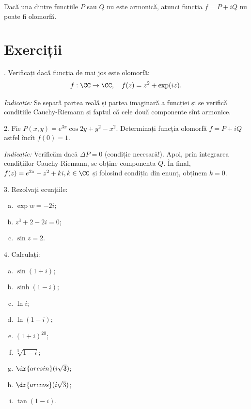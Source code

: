 \begin{corollary}\label{cor:not-olo}
  Dacă una dintre funcțiile $ P $ sau $ Q $ nu este armonică, atunci funcția
  $ f = P + iQ $ nu poate fi olomorfă.
\end{corollary}


\section{Exerciții}

\indent{}. Verificați dacă funcția de mai jos este olomorfă:
\[
  f : \CC \to \CC, \quad f(z) = z^2 + \exp(iz).
\]

\emph{Indicație:} Se separă partea reală și partea imaginară a funcției
și se verifică condițiile Cauchy-Riemann și faptul că cele două componente
sînt armonice.

\vspace{0.3cm}

2. Fie $ P(x, y) = e^{3x}\cos 2y + y^2 - x^2 $. Determinați funcția olomorfă
$ f = P + iQ $ astfel încît $ f(0) = 1 $.

\emph{Indicație:} Verificăm dacă $ \Delta P = 0 $ (condiție necesară!).
Apoi, prin integrarea condițiilor Cauchy-Riemann, se obține componenta
$ Q $. În final, $ f(z) = e^{2z} - z^2 + ki, k \in \CC $ și folosind
condiția din enunț, obținem $ k = 0 $.

\vspace{0.3cm}

3. Rezolvați ecuațiile:
\begin{enumerate}[(a)]
\item $ \exp w = -2i $;
\item $ z^3 + 2 - 2i = 0 $;
\item $ \sin z = 2 $.
\end{enumerate}

\vspace{0.3cm}

4. Calculați:
\begin{enumerate}[(a)]
\item $ \sin(1 + i) $;
\item $ \sinh(1 - i) $;
\item $ \ln i $;
\item $ \ln(1 - i) $;
\item $ (1 + i)^{20} $;
\item $ \sqrt[5]{1 - i} $;
\item $ \dr{arcsin}(i\sqrt{3}) $;
\item $ \dr{arccos}(i\sqrt{3}) $;
\item $ \tan(1 - i) $.
\end{enumerate}

